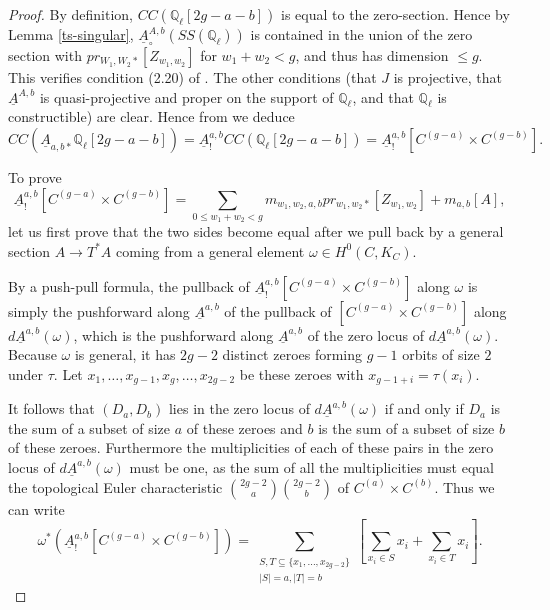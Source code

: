 \begin{proof} By definition, $CC ( \mathbb Q_\ell [ 2g-a-b] )$ is equal to the zero-section. Hence by Lemma \ref{ts-singular},  $\underline{A}^{A,b}_{\circ} ( SS (\mathbb Q_\ell) ) $ is contained in the union of the zero section with $pr_{W_1,W_2 *} [ Z_{w_1,w_2} ]$ for $w_1+w_2<g$, and thus has dimension $\leq g$.  This verifies condition (2.20) of \cite[Theorem 2.2.5]{saito-direct}. The other conditions (that $J$ is projective, that $\underline{A}^{A,b}$ is quasi-projective and proper on the support of $\mathbb Q_\ell$, and that $\mathbb Q_\ell$ is constructible) are clear. Hence from \cite[Theorem 2.2.5]{saito-direct} we deduce \[CC  ( \underline{A}_{a,b *} \mathbb Q_\ell[2g-a-b] )= \underline{A}^{a,b}_! CC( \mathbb Q_\ell[2g-a-b]) = \underline{A}^{a,b}_! [ C^{(g-a)} \times C^{(g-b) }]. \]

To prove \[  \underline{A}^{a,b}_! [ C^{(g-a)} \times C^{(g-b) }] = \sum_{0 \leq w_1+ w_2 < g} m_{w_1,w_2,a,b}  pr_{w_1,w_2 *} [ Z_{w_1,w_2} ]  + m_{a,b} [ A]  ,\] let us first prove that the two sides become equal after we pull back by a general section $A \to T^* A$ coming from a general element $\omega  \in H^0(C, K_C)$.

By a push-pull formula, the pullback of $\underline{A}^{a,b}_! [ C^{(g-a)} \times C^{(g-b) }]$ along $\omega$ is simply the pushforward along $\underline{A}^{a,b}$ of the pullback of $[ C^{(g-a)} \times C^{(g-b) }]$ along $d \underline{A}^{a,b} (\omega)$, which is the pushforward along $\underline{A}^{a,b}$ of the zero locus of $d \underline{A}^{a,b} (\omega)$. Because $\omega$ is general, it has $2g-2$ distinct zeroes forming $g-1$ orbits of size $2$ under $\tau$. Let $x_1,\dots, x_{g-1}, x_g,\dots, x_{2g-2}$ be these zeroes with $x_{g-1+i} = \tau(x_i)$.

It follows that $(D_a, D_b)$ lies in the zero locus of $d \underline{A}^{a,b} (\omega)$ if and only if $D_a$ is the sum of a subset of size $a$ of these zeroes and $b$ is the sum of a subset of size $b$ of these zeroes. Furthermore the multiplicities of each of these pairs in the zero locus of  $d \underline{A}^{a,b} (\omega)$ must be one, as the sum of all the multiplicities must equal the topological Euler characteristic $\binom{2g-2 }{ a} \binom{2g-2 }{ b}$ of $C^{(a)} \times C^{(b)}$. Thus we can write \[ \omega^* ( \underline{A}^{a,b}_! [ C^{(g-a)} \times C^{(g-b) } ] ) = \sum_{ \substack{ S ,T \subseteq \{x_1,\dots, x_{2g-2}\} \\ |S| = a, |T|= b}} \left[ \sum_{x_i \in S} x_i + \sum_{x_i \in T} x_i \right] .\]


\end{proof}
